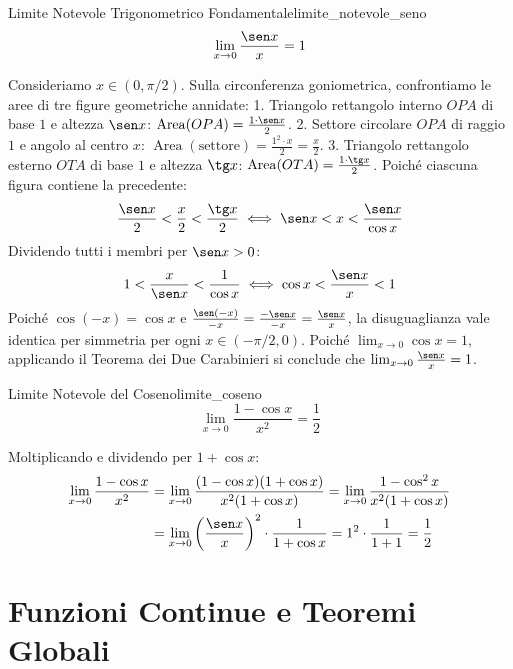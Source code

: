 \begin{teorema}{Limite Notevole Trigonometrico Fondamentale}{limite_notevole_seno}
\[
    \lim_{x \to 0} \frac{\sen x}{x} = 1
\]
\end{teorema}

\begin{dimostrazione}
Consideriamo $x \in (0, \pi/2)$. Sulla circonferenza goniometrica, confrontiamo le aree di tre figure geometriche annidate:
1. Triangolo rettangolo interno $O P A$ di base $1$ e altezza $\sen x$: $\operatorname{Area}(OPA) = \frac{1 \cdot \sen x}{2}$.
2. Settore circolare $O P A$ di raggio $1$ e angolo al centro $x$: $\operatorname{Area}(\text{settore}) = \frac{1^2 \cdot x}{2} = \frac{x}{2}$.
3. Triangolo rettangolo esterno $O T A$ di base $1$ e altezza $\tg x$: $\operatorname{Area}(OTA) = \frac{1 \cdot \tg x}{2}$.
Poiché ciascuna figura contiene la precedente:
\[
    \frac{\sen x}{2} < \frac{x}{2} < \frac{\tg x}{2} \iff \sen x < x < \frac{\sen x}{\cos x}
\]
Dividendo tutti i membri per $\sen x > 0$:
\[
    1 < \frac{x}{\sen x} < \frac{1}{\cos x} \iff \cos x < \frac{\sen x}{x} < 1
\]
Poiché $\cos(-x) = \cos x$ e $\frac{\sen(-x)}{-x} = \frac{-\sen x}{-x} = \frac{\sen x}{x}$, la disuguaglianza vale identica per simmetria per ogni $x \in (-\pi/2, 0)$.
Poiché $\lim_{x \to 0} \cos x = 1$, applicando il Teorema dei Due Carabinieri si conclude che $\lim_{x \to 0} \frac{\sen x}{x} = 1$.
\end{dimostrazione}

\begin{corollario}{Limite Notevole del Coseno}{limite_coseno}
\[
    \lim_{x \to 0} \frac{1 - \cos x}{x^2} = \frac{1}{2}
\]
\end{corollario}

\begin{dimostrazione}
Moltiplicando e dividendo per $1 + \cos x$:
\begin{align*}
    \lim_{x \to 0} \frac{1 - \cos x}{x^2} &= \lim_{x \to 0} \frac{(1 - \cos x)(1 + \cos x)}{x^2(1 + \cos x)} = \lim_{x \to 0} \frac{1 - \cos^2 x}{x^2(1 + \cos x)} \\
    &= \lim_{x \to 0} \left(\frac{\sen x}{x}\right)^2 \cdot \frac{1}{1 + \cos x} = 1^2 \cdot \frac{1}{1 + 1} = \frac{1}{2}
\end{align*}
\end{dimostrazione}

\section{Funzioni Continue e Teoremi Globali}
\label{sec:continuita_teoremi_globali}

